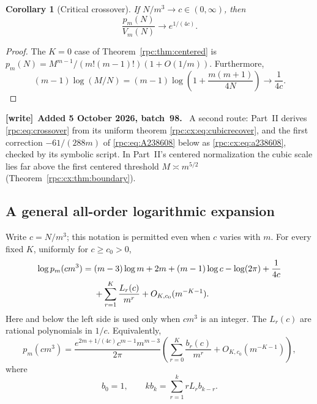 \documentclass[11pt]{article}
\newtheorem{corollary}[theorem]{Corollary}
\theoremstyle{definition}
\theoremstyle{remark}
\numberwithin{equation}{section}
\newenvironment{writenote}[1][]{\par\smallskip\begingroup\small
 \noindent\textbf{[write]}\if\relax\detokenize{#1}\relax\else~\textbf{#1.}\fi\ }%
 {\par\endgroup\smallskip}
\begin{document}
\begin{corollary}[Critical crossover]\label{rpc:cor:crossover}
If $N/m^3\to c\in(0,\infty)$, then
\begin{equation}\label{rpc:eq:crossover}
 \frac{p_m(N)}{V_m(N)}\longrightarrow e^{1/(4c)}.
\end{equation}
\end{corollary}
\begin{proof}
The $K=0$ case of Theorem~\ref{rpc:thm:centered} is
$p_m(N)=M^{m-1}/(m!(m-1)!)(1+O(1/m))$.
Furthermore,
\[
 (m-1)\log(M/N)
 =(m-1)\log\left(1+\frac{m(m+1)}{4N}\right)\longrightarrow\frac1{4c}.
\]
\end{proof}

\begin{writenote}[Added 5 October 2026, batch~98]
A second route: Part~II derives \eqref{rpc:eq:crossover} from its uniform
theorem \eqref{rpc:cx:eq:cubicrecover}, and the first correction
$-61/(288m)$ of \eqref{rpc:eq:A238608} below as \eqref{rpc:cx:eq:a238608},
checked by its symbolic script. In Part~II's centered normalization the
cubic scale lies far above the first centered threshold $M\asymp m^{5/2}$
(Theorem~\ref{rpc:cx:thm:boundary}).
\end{writenote}

\subsection{A general all-order logarithmic expansion}

Write $c=N/m^3$; this notation is permitted even when $c$ varies with $m$.
For every fixed $K$, uniformly for $c\ge c_0>0$,
\begin{align}\label{rpc:eq:critical-log}
 \log p_m(c m^3)
 ={}&(m-3)\log m+2m+(m-1)\log c-\log(2\pi)+\frac1{4c}\notag\\
 &+\sum_{r=1}^K\frac{L_r(c)}{m^r}+O_{K,c_0}(m^{-K-1}).
\end{align}
Here and below the left side is used only when $c m^3$ is an integer.
The $L_r(c)$ are rational polynomials in $1/c$. Equivalently,
\begin{equation}\label{rpc:eq:critical-relative}
 p_m(c m^3)=\frac{e^{2m+1/(4c)}c^{m-1}m^{m-3}}{2\pi}
 \left(\sum_{r=0}^K\frac{b_r(c)}{m^r}+O_{K,c_0}(m^{-K-1})\right),
\end{equation}
where
\begin{equation}\label{rpc:eq:b-rec}
 b_0=1,\qquad k b_k=\sum_{r=1}^k rL_r b_{k-r}.
\end{equation}
\end{document}
